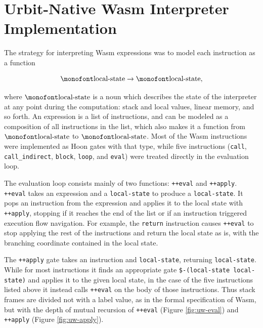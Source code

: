 \documentclass[twoside]{article}
\begin{document}
\section{Urbit-Native Wasm Interpreter Implementation}

The strategy for interpreting Wasm expressions was to model each instruction as a function

$$
\text{\texttt{local-state}} \rightarrow \text{\texttt{local-state}}\text{,}
$$

\noindent
where $\text{\texttt{local-state}}$ is a noun which describes the state of the interpreter at any point during the computation: stack and local values, linear memory, and so forth. An expression is a list of instructions, and can be modeled as a composition of all instructions in the list, which also makes it a function from $\text{\texttt{local-state}}$ to $\text{\texttt{local-state}}$. Most of the Wasm instructions were implemented as Hoon gates with that type, while five instructions (\lstinline[style=inlinecode]{call}, \lstinline[style=inlinecode]{call_indirect}, \lstinline[style=inlinecode]{block}, \lstinline[style=inlinecode]{loop}, and \lstinline[style=inlinecode]{eval}) were treated directly in the evaluation loop.

\sloppy
The evaluation loop consists mainly of two functions: \lstinline[style=inlinecode]{++eval} and \lstinline[style=inlinecode]{++apply}. \lstinline[style=inlinecode]{++eval} takes an expression and a \lstinline[style=inlinecode]{local-state} to produce a \lstinline[style=inlinecode]{local-state}. It pops an instruction from the expression and applies it to the local state with \lstinline[style=inlinecode]{++apply}, stopping if it reaches the end of the list or if an instruction triggered execution flow navigation. For example, the \lstinline[style=inlinecode]{return} instruction causes \lstinline[style=inlinecode]{++eval} to stop applying the rest of the instructions and return the local state as is, with the branching coordinate contained in the local state.

The \lstinline[style=inlinecode]{++apply} gate takes an instruction and \lstinline[style=inlinecode]{local-state}, returning \lstinline[style=inlinecode]{local-state}. While for most instructions it finds an appropriate gate \lstinline[style=inlinecode]{$-(local-state local-state)} and applies it to the given local state, in the case of the five instructions listed above it instead calls \lstinline[style=inlinecode]{++eval} on the body of those instructions. Thus stack frames are divided not with a label value, as in the formal specification of Wasm, but with the depth of mutual recursion of \lstinline[style=inlinecode]{++eval} (Figure \ref{fig:uw-eval}) and \lstinline[style=inlinecode]{++apply} (Figure \ref{fig:uw-apply}).
\end{document}

